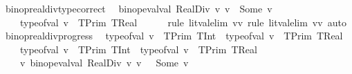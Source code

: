 \begin{isabellebody}
\endisatagproof
{\isafoldproof}%
%
\isadelimproof
\isanewline
%
\endisadelimproof
\isanewline
{}\isamarkupfalse%
\ binop{\isacharunderscore}{\kern0pt}realdiv{\isacharunderscore}{\kern0pt}type{\isacharunderscore}{\kern0pt}correct{\isacharcolon}{\kern0pt}\isanewline
\ {\isachardoublequoteopen}{\isasymlbrakk}\ {\isacharparenleft}{\kern0pt}binop{\isacharunderscore}{\kern0pt}eval{\isacharunderscore}{\kern0pt}val\ RealDiv\ v{}\ v{}{\isacharparenright}{\kern0pt}\ {\isacharequal}{\kern0pt}\ Some\ v\ \ {\isasymrbrakk}\ {\isasymLongrightarrow}\isanewline
\ \ \ \ type{\isacharunderscore}{\kern0pt}of{\isacharunderscore}{\kern0pt}val\ v\ {\isacharequal}{\kern0pt}\ TPrim\ TReal{\isachardoublequoteclose}\ \ \isanewline
%
\isadelimproof
\ \ %
\endisadelimproof
%
\isatagproof
{}\isamarkupfalse%
\ {\isacharparenleft}{\kern0pt}rule\ lit{\isacharunderscore}{\kern0pt}val{\isacharunderscore}{\kern0pt}elim{\isacharbrackleft}{\kern0pt}\ v{\isacharequal}{\kern0pt}v{}{\isacharbrackright}{\kern0pt}{\isacharsemicolon}{\kern0pt}\ rule\ lit{\isacharunderscore}{\kern0pt}val{\isacharunderscore}{\kern0pt}elim{\isacharbrackleft}{\kern0pt}\ v{\isacharequal}{\kern0pt}v{}{\isacharbrackright}{\kern0pt}{\isacharsemicolon}{\kern0pt}\ auto{\isacharparenright}{\kern0pt}%
\endisatagproof
{\isafoldproof}%
%
\isadelimproof
\isanewline
%
\endisadelimproof
\isanewline
{}\isamarkupfalse%
\ binop{\isacharunderscore}{\kern0pt}realdiv{\isacharunderscore}{\kern0pt}progress{\isacharcolon}{\kern0pt}\isanewline
\ {\isachardoublequoteopen}{\isasymlbrakk}\ type{\isacharunderscore}{\kern0pt}of{\isacharunderscore}{\kern0pt}val\ v{}\ {\isacharequal}{\kern0pt}\ TPrim\ TInt\ {\isasymor}\ type{\isacharunderscore}{\kern0pt}of{\isacharunderscore}{\kern0pt}val\ v{}\ {\isacharequal}{\kern0pt}\ TPrim\ TReal{\isacharsemicolon}{\kern0pt}\isanewline
\ \ \ \ type{\isacharunderscore}{\kern0pt}of{\isacharunderscore}{\kern0pt}val\ v{}\ {\isacharequal}{\kern0pt}\ TPrim\ TInt\ {\isasymor}\ type{\isacharunderscore}{\kern0pt}of{\isacharunderscore}{\kern0pt}val\ v{}\ {\isacharequal}{\kern0pt}\ TPrim\ TReal\ {\isasymrbrakk}\ {\isasymLongrightarrow}\isanewline
\ \ \ \ {\isasymexists}v{\isachardot}{\kern0pt}\ binop{\isacharunderscore}{\kern0pt}eval{\isacharunderscore}{\kern0pt}val\ RealDiv\ v{}\ v{}\ \ {\isacharequal}{\kern0pt}\ Some\ v{\isachardoublequoteclose}\isanewline
%
\isadelimproof
\ \ %
\endisadelimproof
%
\isatagproof

\end{isabellebody}
